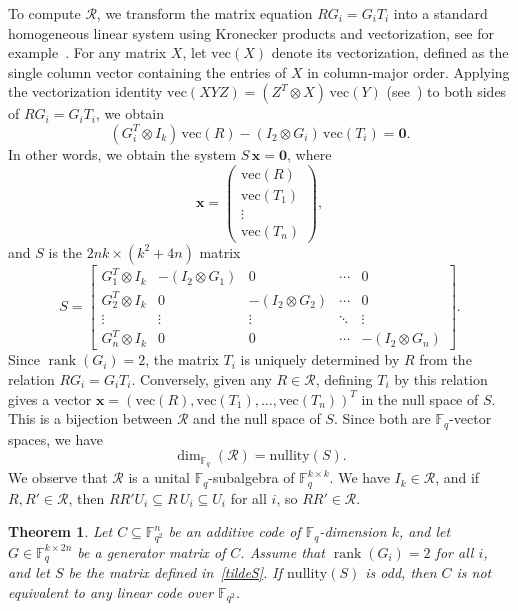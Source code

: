 \documentclass[a4paper,12pt]{article}
\theoremstyle{plain}
\newtheorem{theorem}[lemma]{Theorem}
\theoremstyle{definition}
\begin{document}
To compute $\mathcal{R}$, we transform the matrix equation $RG_i = G_iT_i$ into a standard homogeneous 
linear system using Kronecker products and vectorization, see for example~\cite[Subsection~2.4]{magnus2019}. 
For any matrix $X$, let $\mathrm{vec}(X)$ denote its vectorization, defined as the single column vector containing the entries of $X$ in column-major order. 
Applying the vectorization identity $\mathrm{vec}(XYZ) = (Z^T \otimes X)\,\mathrm{vec}(Y)$ (see~\cite[Theorem~2.2]{magnus2019}) to both sides of $RG_i = G_iT_i$, we obtain
\[
(G_i^T \otimes I_k)\,\mathrm{vec}(R) - (I_2 \otimes G_i)\,\mathrm{vec}(T_i) = \mathbf{0}.
\]
In other words, we obtain the system $S\,\mathbf{x} = \mathbf{0}$, where
\[
\mathbf{x}= \begin{pmatrix} \mathrm{vec}(R) \\ \mathrm{vec}(T_1) \\ \vdots \\ \mathrm{vec}(T_n) \end{pmatrix},
\]
and $S$ is the $2nk \times (k^2 + 4n)$ matrix
\begin{equation} \label{tildeS}
S = \begin{bmatrix}
G_1^T \otimes I_k & -(I_2 \otimes G_1) & 0 & \cdots & 0 \\
G_2^T \otimes I_k & 0 & -(I_2 \otimes G_2) & \cdots & 0 \\
\vdots & \vdots & \vdots & \ddots & \vdots \\
G_n^T \otimes I_k & 0 & 0 & \cdots & -(I_2 \otimes G_n)
\end{bmatrix}.
\end{equation}
Since $\operatorname{rank}(G_i) = 2$, the matrix $T_i$ is uniquely determined by $R$ from the relation $RG_i = G_iT_i$. Conversely, given any $R \in \mathcal{R}$, defining $T_i$ by this relation gives a vector $\mathbf{x} = (\mathrm{vec}(R), \mathrm{vec}(T_1), \dots, \mathrm{vec}(T_n))^T$ in the null space of $S$. This is a bijection between $\mathcal{R}$ and the null space of $S$. Since both are $\mathbb{F}_q$-vector spaces, we have
$$
\dim_{\mathbb{F}_q}(\mathcal{R}) = \mathrm{nullity}(S).
$$
We observe that $\mathcal{R}$ is a unital $\mathbb{F}_q$-subalgebra of $\mathbb{F}_q^{k \times k}$. We have $I_k \in \mathcal{R}$, and if $R, R' \in \mathcal{R}$, then $RR' U_i \subseteq R\, U_i \subseteq U_i$ for all $i$, so $RR' \in \mathcal{R}$.



\begin{theorem} \label{notSLetest} \label{oddnullity}
Let $C \subseteq \mathbb{F}_{q^2}^n$ be an additive code of $\mathbb{F}_q$-dimension $k$, and let $G \in \mathbb{F}_q^{k \times 2n}$ be a generator matrix of $C$. 
Assume that $\operatorname{rank}(G_i) = 2$ for all $i$, and let $S$ be the matrix defined in~\eqref{tildeS}. 
If $\mathrm{nullity}(S)$ is odd, then $C$ is not equivalent to any linear code over $\mathbb{F}_{q^2}$.

\end{theorem}
\end{document}
